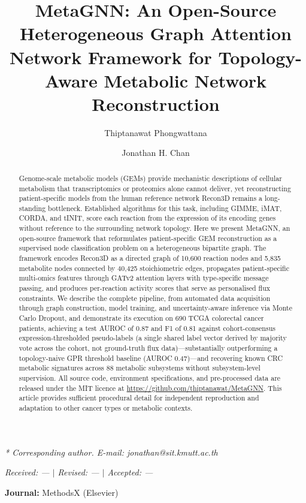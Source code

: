 \documentclass[12pt,a4paper]{article}
\begin{document}
\title{MetaGNN: An Open-Source Heterogeneous Graph Attention Network Framework for Topology-Aware Metabolic Network Reconstruction}

\author[1]{Thiptanawat Phongwattana}
\author[1,*]{Jonathan H. Chan}
\date{}
\maketitle

\noindent\textit{* Corresponding author. E-mail: jonathan@sit.kmutt.ac.th}

\noindent\textit{Received: --- $|$ Revised: --- $|$ Accepted: ---}

\vspace{0.5cm}
\noindent\textbf{Journal:} MethodsX (Elsevier)

\begin{abstract}
Genome-scale metabolic models (GEMs) provide mechanistic descriptions of cellular metabolism that transcriptomics or proteomics alone cannot deliver, yet reconstructing patient-specific models from the human reference network Recon3D remains a long-standing bottleneck. Established algorithms for this task, including GIMME, iMAT, CORDA, and tINIT, score each reaction from the expression of its encoding genes without reference to the surrounding network topology. Here we present MetaGNN, an open-source framework that reformulates patient-specific GEM reconstruction as a supervised node classification problem on a heterogeneous bipartite graph. The framework encodes Recon3D as a directed graph of 10,600 reaction nodes and 5,835 metabolite nodes connected by 40,425 stoichiometric edges, propagates patient-specific multi-omics features through GATv2 attention layers with type-specific message passing, and produces per-reaction activity scores that serve as personalised flux constraints. We describe the complete pipeline, from automated data acquisition through graph construction, model training, and uncertainty-aware inference via Monte Carlo Dropout, and demonstrate its execution on 690 TCGA colorectal cancer patients, achieving a test AUROC of 0.87 and F1 of 0.81 against cohort-consensus expression-thresholded pseudo-labels (a single shared label vector derived by majority vote across the cohort, not ground-truth flux data)---substantially outperforming a topology-naive GPR threshold baseline (AUROC 0.47)---and recovering known CRC metabolic signatures across 88 metabolic subsystems without subsystem-level supervision. All source code, environment specifications, and pre-processed data are released under the MIT licence at \url{https://github.com/thiptanawat/MetaGNN}. This article provides sufficient procedural detail for independent reproduction and adaptation to other cancer types or metabolic contexts.
\end{abstract}
\end{document}
